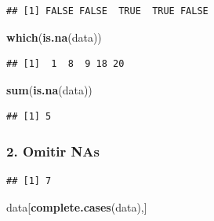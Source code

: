 \documentclass[
]{book}
\newenvironment{Shaded}{\begin{snugshade}}{\end{snugshade}}
\newcommand{\AttributeTok}[1]{\textcolor[rgb]{0.13,0.29,0.53}{#1}}
\newcommand{\ConstantTok}[1]{\textcolor[rgb]{0.56,0.35,0.01}{#1}}
\newcommand{\FunctionTok}[1]{\textcolor[rgb]{0.13,0.29,0.53}{\textbf{#1}}}
\newcommand{\NormalTok}[1]{#1}
\newcommand{\SpecialCharTok}[1]{\textcolor[rgb]{0.81,0.36,0.00}{\textbf{#1}}}
\begin{document}
\begin{Shaded}
\end{Shaded}

\begin{verbatim}
## [1] FALSE FALSE  TRUE  TRUE FALSE
\end{verbatim}

\begin{Shaded}
\begin{Highlighting}[]
\FunctionTok{which}\NormalTok{(}\FunctionTok{is.na}\NormalTok{(data))}
\end{Highlighting}
\end{Shaded}

\begin{verbatim}
## [1]  1  8  9 18 20
\end{verbatim}

\begin{Shaded}
\begin{Highlighting}[]
\FunctionTok{sum}\NormalTok{(}\FunctionTok{is.na}\NormalTok{(data))}
\end{Highlighting}
\end{Shaded}

\begin{verbatim}
## [1] 5
\end{verbatim}

\subsubsection{2. Omitir NAs}\label{omitir-nas}

\begin{Shaded}
\end{Shaded}

\begin{verbatim}
## [1] 7
\end{verbatim}

\begin{Shaded}
\begin{Highlighting}[]
\NormalTok{data[}\FunctionTok{complete.cases}\NormalTok{(data),]}
\end{Highlighting}
\end{Shaded}
\end{document}
